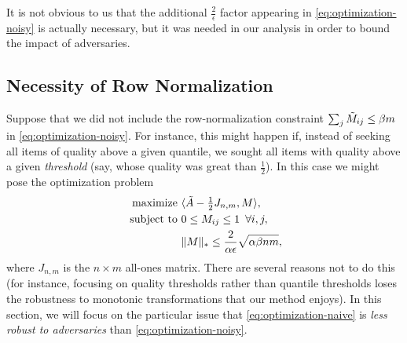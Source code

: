 It is not obvious to us that the additional $\frac{2}{\epsilon}$ factor appearing 
in \eqref{eq:optimization-noisy} is actually necessary, but it was needed in our 
analysis in order to bound the impact of adversaries.

\subsection{Necessity of Row Normalization}

Suppose that we did not include the row-normalization constraint 
$\sum_j \tilde{M}_{ij} \leq \beta m$ in \eqref{eq:optimization-noisy}. For instance, 
this might happen if, instead of seeking all items of quality above a given 
quantile, we sought all items with quality above a given \emph{threshold} (say, 
whose quality was great than $\frac{1}{2}$). In this case we might pose the 
optimization problem
\begin{align}
\label{eq:optimization-naive}
\text{maximize } &\langle \tilde{A}-\tfrac{1}{2}J_{n,m}, M \rangle, \\
\notag \text{ subject to } &0 \leq M_{ij} \leq 1 \,\,\, \forall i,j, \\
\notag                     &\|M\|_* \leq \frac{2}{\alpha\epsilon}\sqrt{\alpha\beta nm},
\end{align}
where $J_{n,m}$ is the $n \times m$ all-ones matrix. There are several reasons not 
to do this (for instance, focusing on quality thresholds rather than quantile 
thresholds loses the robustness to monotonic transformations that our method 
enjoys). In this section, we will focus on the particular issue that 
\eqref{eq:optimization-naive} is \emph{less robust to adversaries} than 
\eqref{eq:optimization-noisy}.

